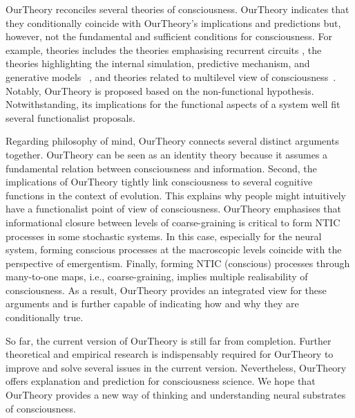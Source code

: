 \documentclass[utf8]{article}
\begin{document}
    
    \ac{OurTheory} reconciles several theories of consciousness. \ac{OurTheory} indicates that they conditionally coincide with \ac{OurTheory}'s implications and predictions but, however, not the fundamental and sufficient conditions for consciousness. For example, theories includes the theories emphasising recurrent circuits \citep{lamme2006towards, edelman1992bright}, the theories highlighting the internal simulation,  predictive mechanism, and generative models ~\citep{revonsuo2006inner, clark_2013,Hohwy2013, kanai_chang_yu_de_abril_biehl_guttenberg_2019, seth2014predictive, seth2015presence}, and theories related to multilevel view of consciousness~\citep{pennartz2018consciousness,pennartz2015brain,prinz2007intermediate, jackendoff1987consciousness}. Notably, \ac{OurTheory} is proposed based on the non-functional hypothesis. Notwithstanding, its implications for the functional aspects of a system well fit several functionalist proposals.
	
	
	Regarding philosophy of mind, \ac{OurTheory} connects several distinct arguments together. \ac{OurTheory} can be seen as an identity theory because it assumes a fundamental relation between consciousness and information. Second, the implications of \ac{OurTheory} tightly link consciousness to several cognitive functions in the context of evolution. This explains why people might intuitively have a functionalist point of view of consciousness. \ac{OurTheory} emphasises that informational closure between levels of coarse-graining is critical to form NTIC processes in some stochastic systems. In this case, especially for the neural system, forming conscious processes at the macroscopic levels coincide with the perspective of emergentism. Finally, forming NTIC (conscious) processes through many-to-one maps, i.e., coarse-graining, implies multiple realisability of consciousness. As a result, \ac{OurTheory} provides an integrated view for these arguments and is further capable of indicating how and why they are conditionally true.
	
	So far, the current version of \ac{OurTheory} is still far from completion. Further theoretical and empirical research is indispensably required for \ac{OurTheory} to improve and solve several issues in the current version. Nevertheless, \ac{OurTheory} offers explanation and prediction for consciousness science. We hope that \ac{OurTheory} provides a new way of thinking and understanding neural substrates of consciousness.  
	
\end{document}
